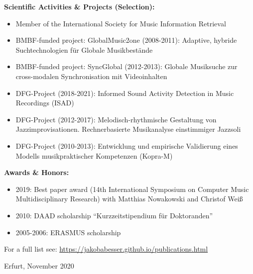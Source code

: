 \documentclass[8pt,a4paper]{article}
\newenvironment{itemizePacked}{
\begin{itemize}
  \setlength{\itemsep}{1pt}
  \setlength{\parskip}{3pt}
  \setlength{\parsep}{0pt}
  \renewcommand{\labelitemi}{$\bullet$}
}{\end{itemize}}
\begin{document}
{\bf Scientific Activities \& Projects (Selection):}
\begin{itemizePacked}
\item Member of the International Society for Music Information Retrieval %
\item BMBF-funded project: GlobalMusic2one (2008-2011): Adaptive, hybride Suchtechnologien f{\"u}r Globale Musikbest{\"a}nde
\item BMBF-funded project: SyncGlobal (2012-2013): Globale Musiksuche zur cross-modalen Synchronisation mit Videoinhalten
\item DFG-Project (2018-2021): Informed Sound Activity Detection in Music Recordings (ISAD) 
\item DFG-Project (2012-2017): Melodisch-rhythmische Gestaltung von Jazzimprovisationen. Rechnerbasierte Musikanalyse einstimmiger Jazzsoli
\item DFG-Project (2010-2013): Entwicklung und empirische Validierung eines Modells musikpraktischer Kompetenzen (Kopra-M)

\end{itemizePacked}

\vspace*{0.2cm}

{\bf Awards \& Honors:}
\begin{itemizePacked}
\item 2019: Best paper award (14th International Symposium on Computer Music Multidisciplinary Research) with Matthias Nowakowski and Christof Wei\ss
\item 2010: DAAD scholarship ``Kurzzeitstipendium f{\"u}r Doktoranden''
\item 2005-2006: ERASMUS scholarship
\end{itemizePacked}

\vspace*{0.2cm}

\nocite{Abesser:2020:AS}
\nocite{Pfleiderer:2017:BOOK}
\nocite{Abesser_2017_IEEE_b}
\nocite{Abesser:2017:IEEE}
\nocite{Frieler:2016:MS}
\nocite{Abesser:2014:PHD}
\nocite{Abesser:2012:CMMR}
\nocite{Abesser:2012:JNMR}
\nocite{Dittmar:2012:MMP}
\nocite{Brandenburg:2009:BOOK}





For a full list see: \url{https://jakobabesser.github.io/publications.html}

\vspace{1cm}

Erfurt, November 2020
\end{document}
